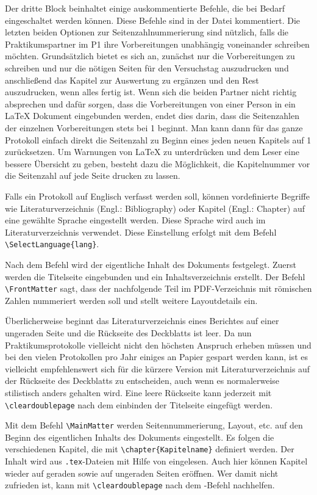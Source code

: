 Der dritte Block beinhaltet einige auskommentierte Befehle, die bei Bedarf eingeschaltet werden können. Diese Befehle sind in der Datei kommentiert. Die letzten beiden Optionen zur Seitenzahlnummerierung sind nützlich, falls die Praktikumspartner im P1 ihre Vorbereitungen unabhängig voneinander schreiben möchten. Grundsätzlich bietet es sich an, zunächst nur die Vorbereitungen zu schreiben und nur die nötigen Seiten für den Versuchstag auszudrucken und anschließend das Kapitel zur Auswertung zu ergänzen und den Rest auszudrucken, wenn alles fertig ist. Wenn sich die beiden Partner nicht richtig absprechen und dafür sorgen, dass die Vorbereitungen von einer Person in ein LaTeX Dokument eingebunden werden, endet dies darin, dass die Seitenzahlen der einzelnen Vorbereitungen stets bei 1 beginnt. Man kann dann für das ganze Protokoll einfach direkt die Seitenzahl zu Beginn eines jeden neuen Kapitels auf 1 zurücksetzen. Um Warnungen von LaTeX zu unterdrücken und dem Leser eine bessere Übersicht zu geben, besteht dazu die Möglichkeit, die Kapitelnummer vor die Seitenzahl auf jede Seite drucken zu lassen.

Falls ein Protokoll auf Englisch verfasst werden soll, können vordefinierte Begriffe wie Literaturverzeichnis (Engl.: Bibliography) oder Kapitel (Engl.: Chapter) auf eine gewählte Sprache eingestellt werden. Diese Sprache wird auch im Literaturverzeichnis verwendet. Diese Einstellung erfolgt mit dem Befehl \verb|\SelectLanguage{lang}|.

Nach dem Befehl \verb|| wird der eigentliche Inhalt des Dokuments festgelegt. Zuerst werden die Titelseite eingebunden und ein Inhaltsverzeichnis erstellt. Der Befehl \verb|\FrontMatter| sagt, dass der nachfolgende Teil im PDF-Verzeichnis mit römischen Zahlen nummeriert werden soll und stellt weitere Layoutdetails ein.

Überlicherweise beginnt das Literaturverzeichnis eines Berichtes auf einer ungeraden Seite und die Rückseite des Deckblatts ist leer. Da nun Praktikumsprotokolle vielleicht nicht den höchsten Anspruch erheben müssen und bei den vielen Protokollen pro Jahr einiges an Papier gespart werden kann, ist es vielleicht empfehlenswert sich für die kürzere Version mit Literaturverzeichnis auf der Rückseite des Deckblatts zu entscheiden, auch wenn es normalerweise stilistisch anders gehalten wird. Eine leere Rückseite kann jederzeit mit \verb|\cleardoublepage| nach dem einbinden der Titelseite eingefügt werden.

Mit dem Befehl \verb|\MainMatter| werden Seitennummerierung, Layout, etc. auf den Beginn des eigentlichen Inhalts des Dokuments eingestellt. Es folgen die verschiedenen Kapitel, die mit \verb|\chapter{Kapitelname}| definiert werden. Der Inhalt wird aus \verb|.tex|-Dateien mit Hilfe von \verb|| eingelesen. Auch hier können Kapitel wieder auf geraden sowie auf ungeraden Seiten eröffnen. Wer damit nicht zufrieden ist, kann mit \verb|\cleardoublepage| nach dem \verb||-Befehl nachhelfen.

